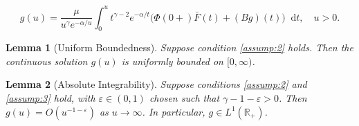\documentclass[10pt,a4paper]{amsart}
\newtheorem{lemma}{Lemma}
\providecommand{\diff}{\mathop{}\!\mathrm{d}}
\begin{document}
\begin{equation}\label{eq:volterra_zero}
g(u) = \frac{\mu}{u^\gamma e^{-\alpha/u}} \int_0^u t^{\gamma-2} e^{-\alpha/t} \big( \Phi(0+) \bar{F}(t) + (Bg)(t) \big) \diff t, \quad u > 0.
\end{equation}

\begin{lemma}[Uniform Boundedness]\label{lem:boundedness}
Suppose condition \ref{assump:2} holds. Then the continuous solution $g(u)$ is uniformly bounded on $[0,\infty)$.
\end{lemma}

\begin{lemma}[Absolute Integrability]\label{lem:iis}
Suppose conditions \ref{assump:2} and \ref{assump:3} hold, with $\varepsilon \in (0,1)$ chosen such that $\gamma-1-\varepsilon > 0$. Then $g(u) = O(u^{-1-\varepsilon})$ as $u \to \infty$. In particular, $g \in L^1(\mathbb{R}_+)$.
\end{lemma}
\end{document}

